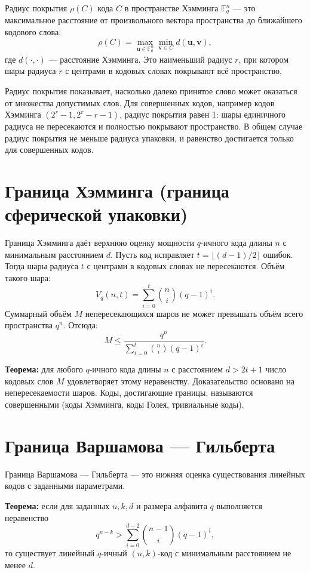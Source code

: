 \documentclass{article}
\begin{document}
Радиус покрытия \( \rho(C) \) кода \( C \) в пространстве Хэмминга \( \mathbb{F}_q^n \) — это максимальное расстояние от произвольного вектора пространства до ближайшего кодового слова:
\[
\rho(C) = \max_{\mathbf{u} \in \mathbb{F}_q^n} \min_{\mathbf{v} \in C} d(\mathbf{u}, \mathbf{v}),
\]
где \( d(\cdot,\cdot) \) — расстояние Хэмминга. Это наименьший радиус \( r \), при котором шары радиуса \( r \) с центрами в кодовых словах покрывают всё пространство.

Радиус покрытия показывает, насколько далеко принятое слово может оказаться от множества допустимых слов. Для совершенных кодов, например кодов Хэмминга \( (2^r-1, 2^r-r-1) \), радиус покрытия равен 1: шары единичного радиуса не пересекаются и полностью покрывают пространство. В общем случае радиус покрытия не меньше радиуса упаковки, и равенство достигается только для совершенных кодов.

\section{Граница Хэмминга (граница сферической упаковки)}

Граница Хэмминга даёт верхнюю оценку мощности \( q \)-ичного кода длины \( n \) с минимальным расстоянием \( d \). Пусть код исправляет \( t = \lfloor (d-1)/2 \rfloor \) ошибок. Тогда шары радиуса \( t \) с центрами в кодовых словах не пересекаются. Объём такого шара:
\[
V_q(n, t) = \sum_{i=0}^{t} \binom{n}{i} (q-1)^i.
\]
Суммарный объём \( M \) непересекающихся шаров не может превышать объём всего пространства \( q^n \). Отсюда:
\[
M \le \frac{q^n}{\sum_{i=0}^{t} \binom{n}{i} (q-1)^i}.
\]

\textbf{Теорема:} для любого \( q \)-ичного кода длины \( n \) с расстоянием \( d > 2t+1 \) число кодовых слов \( M \) удовлетворяет этому неравенству. Доказательство основано на непересекаемости шаров. Коды, достигающие границы, называются совершенными (коды Хэмминга, коды Голея, тривиальные коды).

\section{Граница Варшамова — Гильберта}

Граница Варшамова — Гильберта — это нижняя оценка существования линейных кодов с заданными параметрами.

\textbf{Теорема:} если для заданных \( n, k, d \) и размера алфавита \( q \) выполняется неравенство
\[
q^{n-k} > \sum_{i=0}^{d-2} \binom{n-1}{i} (q-1)^i,
\]
то существует линейный \( q \)-ичный \( (n, k) \)-код с минимальным расстоянием не менее \( d \).
\end{document}
